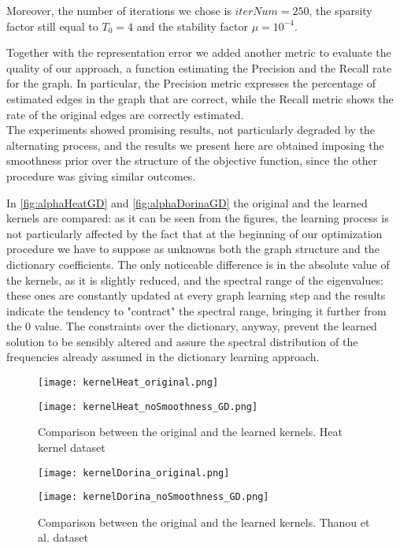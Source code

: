 Moreover, the number of iterations we chose is $iterNum = 250$, the sparsity factor still equal to $T_0 = 4$ and the stability factor $\mu = 10^{-4}$.

Together with the representation error we added another metric to evaluate the quality of our approach, a function estimating the Precision and the Recall rate for the graph. In particular, the Precision metric expresses the percentage of estimated edges in the graph that are correct, while the Recall metric shows the rate of the original edges are correctly estimated.\\
The experiments showed promising results, not particularly degraded by the alternating process, and the results we present here are obtained imposing the smoothness prior over the structure of the objective function, since the other procedure was giving similar outcomes.

In \autoref{fig:alphaHeatGD} and \autoref{fig:alphaDorinaGD} the original and the learned kernels are compared: as it can be seen from the figures, the learning process is not particularly affected  by the fact that at the beginning of our optimization procedure we have to suppose as unknowns both the graph structure and the dictionary coefficients. The only noticeable difference is in the absolute value of the kernels, as it is slightly reduced, and the spectral range of the eigenvalues: these ones are constantly updated at every graph learning step and the results indicate the tendency to "contract" the spectral range, bringing it further from the 0 value. The constraints over the dictionary, anyway, prevent the learned solution to be sensibly altered and assure the spectral distribution of the frequencies already assumed in the dictionary learning approach.

\begin{figure}[hb]
  \begin{minipage}[c]{.5\textwidth}
    \centering
    \texttt{[image: kernelHeat\_original.png]}
  \end{minipage}
  \begin{minipage}[c]{.5\textwidth}
    \centering
    \texttt{[image: kernelHeat\_noSmoothness\_GD.png]}
  \end{minipage}
  \caption{Comparison between the original and the learned kernels. Heat kernel dataset}
  \label{fig:alphaHeatGD}
\end{figure}

\begin{figure}[ht]
  \begin{minipage}[c]{.5\textwidth}
    \centering
    \texttt{[image: kernelDorina\_original.png]}
  \end{minipage}
  \begin{minipage}[c]{.5\textwidth}
    \centering
    \texttt{[image: kernelDorina\_noSmoothness\_GD.png]}
  \end{minipage}
  \caption{Comparison between the original and the learned kernels. Thanou et al. dataset}
  \label{fig:alphaDorinaGD}
\end{figure}

